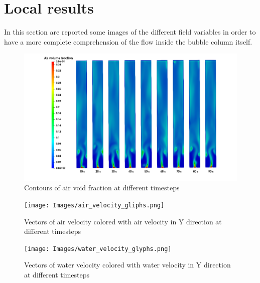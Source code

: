 \documentclass[11pt,a4paper]{article}
\begin{document}
\section{Local results}
\label{sec:localresults}

In this section are reported some images of the different field variables in order to have a more complete comprehension of the flow inside the bubble column itself.

\begin{figure}[!ht]
	\centering
	\includegraphics[width=\textwidth]{Images/times_alpha_run013.png}
	\caption{Contours of air void fraction at different timesteps}
	\label{fig:air_void}
\end{figure}

\begin{figure}[!ht]
	\centering
	\texttt{[image: Images/air\_velocity\_gliphs.png]}
	\caption{Vectors of air velocity colored with air velocity in Y direction at different timesteps}
	\label{fig:air_vect}
\end{figure}

\begin{figure}[!ht]
	\centering
	\texttt{[image: Images/water\_velocity\_glyphs.png]}
	\caption{Vectors of water velocity colored with water velocity in Y direction at different timesteps}
	\label{fig:water_vect}
\end{figure}

\clearpage



\end{document}
